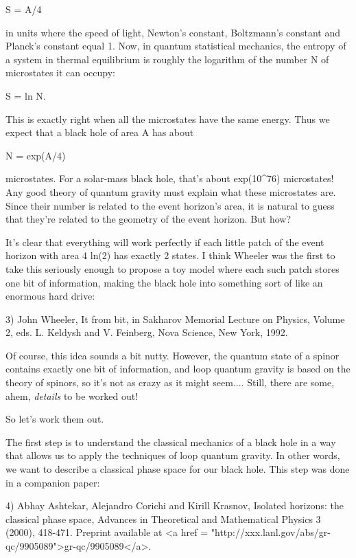                            S = A/4

in units where the speed of light, Newton's constant, Boltzmann's
constant and Planck's constant equal 1.  Now, in quantum statistical
mechanics, the entropy of a system in thermal equilibrium is roughly 
the logarithm of the number N of microstates it can occupy:

                           S = ln N.

This is exactly right when all the microstates have the same energy.
Thus we expect that a black hole of area A has about

                          N = exp(A/4)

microstates.  For a solar-mass black hole, that's about exp(10^76) 
microstates!   Any good theory of quantum gravity must explain what
these microstates are.  Since their number is related to the event
horizon's area, it is natural to guess that they're related to the
geometry of the event horizon.  But how?  

It's clear that everything will work perfectly if each little patch of
the event horizon with area 4 ln(2) has exactly 2 states.  I think
Wheeler was the first to take this seriously enough to propose a toy
model where each such patch stores one bit of information, making the
black hole into something sort of like an enormous hard drive:

3) John Wheeler, It from bit, in Sakharov Memorial Lecture on Physics,
Volume 2, eds. L. Keldysh and V. Feinberg, Nova Science, New York, 1992.

Of course, this idea sounds a bit nutty.  However, the quantum state of
a spinor contains exactly one bit of information, and loop quantum
gravity is based on the theory of spinors, so it's not as crazy as it
might seem....  Still, there are some, ahem, \emph{details} to be worked out! 

So let's work them out.

The first step is to understand the classical mechanics of a black hole
in a way that allows us to apply the techniques of loop quantum gravity.
In other words, we want to describe a classical phase space for our black
hole.   This step was done in a companion paper:

4) Abhay Ashtekar, Alejandro Corichi and Kirill Krasnov, Isolated 
horizons: the classical phase space, Advances in Theoretical and
Mathematical Physics 3 (2000), 418-471.   Preprint available at 
<a href = "http://xxx.lanl.gov/abs/gr-qc/9905089">gr-qc/9905089</a>.

